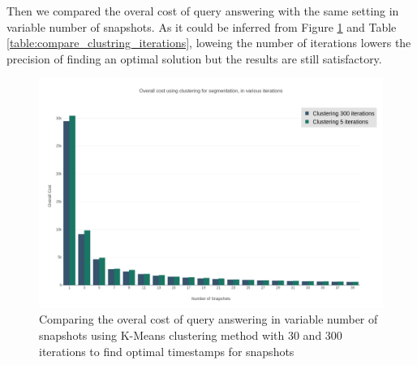 			Then we compared the overal cost of query answering with the same setting in variable number of snapshots. As it could be inferred from Figure \ref{fig:compare_clusterings_iterations} and Table \ref{table:compare_clustring_iterations}, loweing the number of iterations lowers the precision of finding an optimal solution but the results are still satisfactory. 

			\begin{figure}
				\centering
				\includegraphics[width=\textwidth]{figs/compare_clustering_iterations.png}
				\caption{Comparing the overal cost of query answering in variable number of snapshots using K-Means clustering method with 30 and 300 iterations to find optimal timestamps for snapshots}
				\label{fig:compare_clusterings_iterations}
			\end{figure} 

